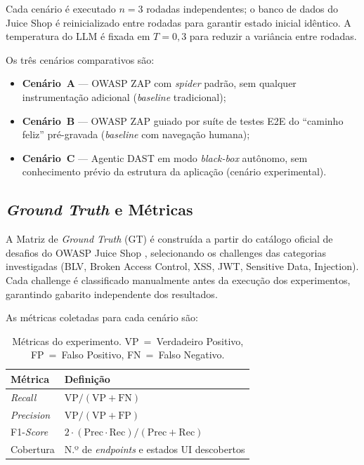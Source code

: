 \documentclass[
    10pt,
    twocolumn,
    a4paper
]{article}
\begin{document}
Cada cenário é executado $n = 3$ rodadas independentes; o banco de
dados do Juice Shop é reinicializado entre rodadas para garantir estado
inicial idêntico. A temperatura do LLM é fixada em $T = 0{,}3$ para
reduzir a variância entre rodadas.

Os três cenários comparativos são:

\begin{itemize}\setlength{\itemsep}{2pt}
  \item \textbf{Cenário~A} --- OWASP ZAP com \textit{spider} padrão,
  sem qualquer instrumentação adicional (\textit{baseline} tradicional);
  \item \textbf{Cenário~B} --- OWASP ZAP guiado por suíte de testes E2E
  do ``caminho feliz'' pré-gravada (\textit{baseline} com navegação
  humana);
  \item \textbf{Cenário~C} --- Agentic DAST em modo \textit{black-box}
  autônomo, sem conhecimento prévio da estrutura da aplicação
  (cenário experimental).
\end{itemize}

\subsection{\textit{Ground Truth} e Métricas}

A Matriz de \textit{Ground Truth} (GT) é construída a partir do catálogo
oficial de desafios do OWASP Juice Shop \cite{owaspjuiceshop},
selecionando os challenges das categorias investigadas (BLV, Broken
Access Control, XSS, JWT, Sensitive Data, Injection). Cada challenge
é classificado manualmente antes da execução dos experimentos, garantindo
gabarito independente dos resultados.

As métricas coletadas para cada cenário são:

\begin{table}[!htb]
\centering
\caption{Métricas do experimento. VP~=~Verdadeiro Positivo,
FP~=~Falso Positivo, FN~=~Falso Negativo.\label{tab:metricas}}
\small
\begin{tabularx}{\columnwidth}{lX}
\toprule
\textbf{Métrica} & \textbf{Definição} \\
\midrule
\textit{Recall}    & $\text{VP} / (\text{VP} + \text{FN})$ \\
\textit{Precision} & $\text{VP} / (\text{VP} + \text{FP})$ \\
F1-\textit{Score}  & $2 \cdot (\text{Prec} \cdot \text{Rec}) /
                     (\text{Prec} + \text{Rec})$ \\
Cobertura          & N.º de \textit{endpoints} e estados UI descobertos \\
\bottomrule
\end{tabularx}
\end{table}
\end{document}
